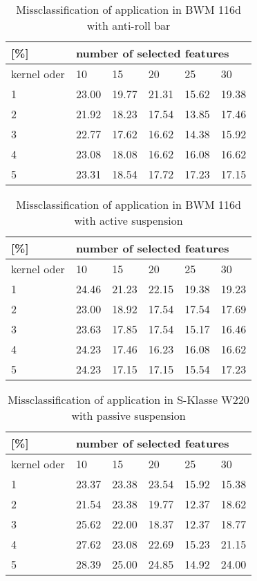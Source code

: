 \begin{table}
\centering
\caption{Missclassification of application in BWM 116d with anti-roll bar}
\label{tbl:setting_2}
\begin{tabular}{llllll}
\hline
{[}\%{]} & \multicolumn{5}{l}{number of selected features} \\ \hline
kernel oder & 10 & 15 & 20 & 25 & 30 \\ 
1 & 23.00 & 19.77 & 21.31 & 15.62 & 19.38 \\
2 & 21.92 & 18.23 & 17.54 & \cellcolor{blue!25}13.85 & 17.46 \\
3 & 22.77 & 17.62 & 16.62 & \cellcolor{blue!50}14.38 & 15.92 \\
4 & 23.08 & 18.08 & 16.62 & 16.08 & 16.62 \\
5 & 23.31 & 18.54 & 17.72 & 17.23 & 17.15 \\ \hline
\end{tabular}
\end{table}

\begin{table}
\centering
\caption{Missclassification of application in BWM 116d with active suspension}
\label{tbl:setting_3}
\begin{tabular}{llllll}
\hline
{[}\%{]} & \multicolumn{5}{l}{number of selected features} \\ \hline
kernel oder & 10 & 15 & 20 & 25 & 30 \\ 
1 & 24.46 & 21.23 & 22.15 & 19.38 & 19.23 \\
2 & 23.00 & 18.92 & 17.54 & \cellcolor{blue!25}17.54 & 17.69 \\
3 & 23.63 & 17.85 & 17.54 & \cellcolor{blue!50}15.17 & 16.46 \\
4 & 24.23 & 17.46 & 16.23 & 16.08 & 16.62 \\
5 & 24.23 & 17.15 & 17.15 & 15.54 & 17.23 \\ \hline
\end{tabular}
\end{table}

\begin{table}
\centering
\caption{Missclassification of application in S-Klasse W220 with passive suspension}
\label{tbl:setting_4}
\begin{tabular}{llllll}
\hline
{[}\%{]} & \multicolumn{5}{l}{number of selected features} \\ \hline
kernel oder & 10 & 15 & 20 & 25 & 30 \\ 
1 & 23.37 & 23.38 & 23.54 & 15.92 & 15.38 \\
2 & 21.54 & 23.38 & 19.77 & \cellcolor{blue!25}12.37 & 18.62 \\
3 & 25.62 & 22.00 & 18.37 & \cellcolor{blue!50}12.37 & 18.77 \\
4 & 27.62 & 23.08 & 22.69 & 15.23 & 21.15 \\
5 & 28.39 & 25.00 & 24.85 & 14.92 & 24.00 \\ \hline
\end{tabular}
\end{table}

